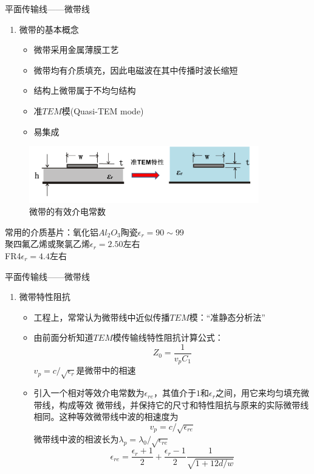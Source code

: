 \begin{frame}{平面传输线——微带线}
    \begin{enumerate}
        \item 微带的基本概念
        \begin{itemize}
            \item 微带采用金属薄膜工艺
            \item 微带均有介质填充，因此电磁波在其中传播时波长缩短
            \item 结构上微带属于不均匀结构
            \item 准$TEM$模(Quasi-TEM mode)
            \item 易集成
        \end{itemize}
        \saveenum
    \end{enumerate}
    \begin{figure}
        \includegraphics[width=10cm]{Cha6//fig6-39.png}
        \caption{微带的有效介电常数}
    \end{figure}
    常用的介质基片：氧化铝$Al_2O_3$陶瓷\quad $\epsilon_r=90\sim 99$\\
    聚四氟乙烯或聚氯乙烯\quad $\epsilon_r=2.50$左右\\
    FR4\quad $\epsilon_r=4.4$左右
\end{frame}

\begin{frame}{平面传输线——微带线}
    \begin{enumerate}
        \resume
        \item 微带特性阻抗\\
        \begin{itemize}
            \item 工程上，常常认为微带线中近似传播$TEM$模：“准静态分析法”
            \item 由前面分析知道$TEM$模传输线特性阻抗计算公式：
            $$Z_0=\frac{1}{v_pC_1}$$
            $v_p=c/\sqrt{\epsilon_r}$是微带中的相速
            \item 引入一个相对等效介电常数为$\epsilon_{re}$，其值介于$1$和$\epsilon_r$之间，用它来均匀填充微带线，构成等效
            微带线，并保持它的尺寸和特性阻抗与原来的实际微带线相同。这种等效微带线中波的相速度为
            $$v_p=c/\sqrt{\epsilon_{re}}$$
            微带线中波的相波长为$\lambda_p=\lambda_0/\sqrt{\epsilon_{re}}$
            $$\epsilon_{re}=\frac{\epsilon_r+1}{2}+\frac{\epsilon_r-1}{2}\frac{1}{\sqrt{1+12d/w}}$$
        \end{itemize}
    \end{enumerate}
\end{frame}

